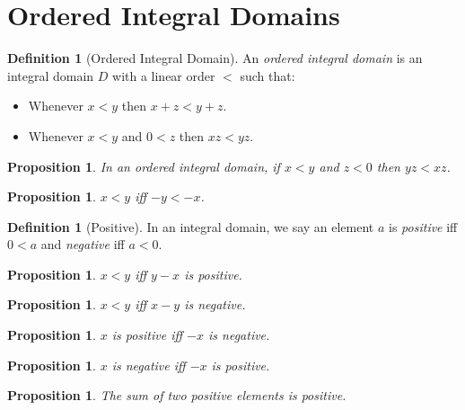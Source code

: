 \documentclass{article}
\newtheorem{proposition}[axiom]{Proposition}
\theoremstyle{definition}
\newtheorem{definition}[axiom]{Definition}
\begin{document}
    \section{Ordered Integral Domains}

    \begin{definition}[Ordered Integral Domain]
        An \emph{ordered integral domain} is an integral domain $D$ with a linear order $<$ such that:
        \begin{itemize}
            \item Whenever $x < y$ then $x + z < y + z$.
            \item Whenever $x < y$ and $0 < z$ then $xz < yz$.
        \end{itemize}
    \end{definition}

    \begin{proposition}
        In an ordered integral domain, if $x < y$ and $z < 0$ then $yz < xz$.
    \end{proposition}

    \begin{proposition}
        $x < y$ iff $-y < -x$.
    \end{proposition}

    \begin{definition}[Positive]
        In an integral domain, we say an element $a$ is \emph{positive} iff $0 < a$ and \emph{negative}
        iff $a < 0$.
    \end{definition}

    \begin{proposition}
        $x < y$ iff $y - x$ is positive.
    \end{proposition}

    \begin{proposition}
        $x < y$ iff $x - y$ is negative.
    \end{proposition}

    \begin{proposition}
        $x$ is positive iff $-x$ is negative.
    \end{proposition}

    \begin{proposition}
        $x$ is negative iff $-x$ is positive.
    \end{proposition}

    \begin{proposition}
        The sum of two positive elements is positive.
    \end{proposition}
\end{document}
